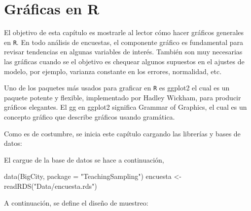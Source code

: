 \documentclass[
  12pt,
]{book}
\newenvironment{Shaded}{\begin{snugshade}}{\end{snugshade}}
\newcommand{\AttributeTok}[1]{\textcolor[rgb]{0.77,0.63,0.00}{#1}}
\newcommand{\CommentTok}[1]{\textcolor[rgb]{0.56,0.35,0.01}{\textit{#1}}}
\newcommand{\DecValTok}[1]{\textcolor[rgb]{0.00,0.00,0.81}{#1}}
\newcommand{\FunctionTok}[1]{\textcolor[rgb]{0.00,0.00,0.00}{#1}}
\newcommand{\NormalTok}[1]{#1}
\newcommand{\OtherTok}[1]{\textcolor[rgb]{0.56,0.35,0.01}{#1}}
\newcommand{\StringTok}[1]{\textcolor[rgb]{0.31,0.60,0.02}{#1}}
\begin{document}
\hypertarget{gruxe1ficas-en-r}{%
\chapter{Gráficas en R}\label{gruxe1ficas-en-r}}

El objetivo de esta capítulo es mostrarle al lector cómo hacer gráficos generales en \texttt{R}. En todo análisis de encuestas, el componente gráfico es fundamental para revisar tendencias en algunas variables de interés. También son muy necesarias las gráficas cuando se el objetivo es chequear algunos supuestos en el ajustes de modelo, por ejemplo, varianza constante en los errores, normalidad, etc.

Uno de los paquetes más usados para graficar en \texttt{R} es ggplot2 el cual es un paquete potente y flexible, implementado por Hadley Wickham, para producir gráficos elegantes. El gg en ggplot2 significa Grammar of Graphics, el cual es un concepto gráfico que describe gráficos usando gramática.

Como es de costumbre, se inicia este capítulo cargando las librerías y bases de datos:

\begin{Shaded}
\end{Shaded}

El cargue de la base de datos se hace a continuación,

\begin{Shaded}
\begin{Highlighting}[]
\FunctionTok{data}\NormalTok{(BigCity, }\AttributeTok{package =} \StringTok{"TeachingSampling"}\NormalTok{)}
\NormalTok{encuesta }\OtherTok{\textless{}{-}} \FunctionTok{readRDS}\NormalTok{(}\StringTok{"Data/encuesta.rds"}\NormalTok{)}
\end{Highlighting}
\end{Shaded}

A continuación, se define el diseño de muestreo:
\end{document}
